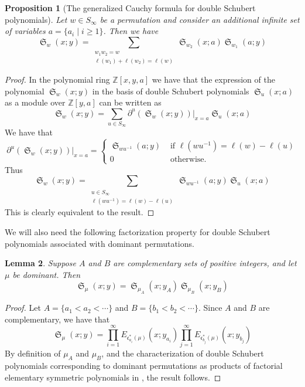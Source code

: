 \documentclass{amsart}
\newtheorem{lemma}{Lemma}[subsection]
\newtheorem{proposition}[lemma]{Proposition}
\theoremstyle{definition}
\theoremstyle{remark}
\numberwithin{equation}{subsection}
\DeclareMathOperator{\sch}{\mathfrak{S}}
\newcommand{\code}{\mathfrak{c}}
\begin{document}
\begin{proposition}[The generalized Cauchy formula for double Schubert polynomials]
Let $w\in S_\infty$ be a permutation and consider an additional infinite set of variables $a=\{a_i\mid i\geq 1\}$. Then we have
$$\sch_w(x;y)=\sum_{\substack{w_1w_2=w\\\ell(w_1)+\ell(w_2)=\ell(w)}}\sch_{w_2}(x;a)\sch_{w_1}(a;y)$$
\end{proposition}
\begin{proof}
In the polynomial ring $\mathbb{Z}[x,y,a]$ we have that the expression of the polynomial $\sch_w(x;y)$ in the basis of double Schubert polynomials $\sch_u(x;a)$ as a module over $\mathbb{Z}[y,a]$ can be written as
$$\sch_w(x;y)=\sum_{u\in S_\infty}\partial^u(\sch_w(x;y))|_{x=a}\sch_u(x;a)$$
We have that 
$$\partial^u(\sch_w(x;y))|_{x=a}=\begin{cases}
\sch_{wu^{-1}}(a;y)&\mbox{ if }\ell(wu^{-1})=\ell(w)-\ell(u)\\
0&\mbox{ otherwise.}
\end{cases}$$
Thus
$$\sch_w(x;y)=\sum_{\substack{u\in S_\infty\\\ell(wu^{-1})=\ell(w)-\ell(u)}}\sch_{wu^{-1}}(a;y)\sch_u(x;a)$$
This is clearly equivalent to the result.
\end{proof}

We will also need the following factorization property for double Schubert polynomials associated with dominant permutations.

\begin{lemma} \label{lemma:domprod}
Suppose $A$ and $B$ are complementary sets of positive integers, and let $\mu$ be dominant. Then
$$\sch_\mu(x;y)=\sch_{\mu_A}(x;y_A)\sch_{\mu_B}(x;y_B)$$
\end{lemma}
\begin{proof}
Let $A=\{a_1<a_2<\cdots\}$ and $B=\{b_1<b_2<\cdots\}$. Since $A$ and $B$ are complementary, we have that
$$\sch_{\mu}(x;y)=\prod_{i=1}^\infty E_{\code^*_{a_i}(\mu)}(x;y_{a_i})\prod_{j=1}^\infty E_{\code^*_{b_j}(\mu)}(x;y_{b_j})$$
By definition of $\mu_A$ and $\mu_B$, and the characterization of double Schubert polynomials corresponding to dominant permutations as products of factorial elementary symmetric polynomials in \cite[Lemma~4.5]{samuelmolev}, the result follows.
\end{proof}
\end{document}
